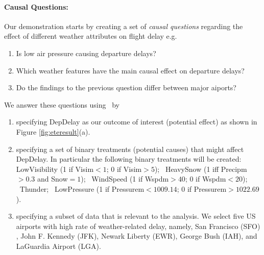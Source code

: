   \paragraph{\bf Causal Questions:}
Our demonstration starts by creating a set of {\em causal questions} regarding the effect of different weather attributes on flight delay e.g.
\begin{enumerate}
  \item Is low air pressure causing departure delays?
  \item Which weather features have the main causal effect on departure delays?
  \item Do the findings to the previous question differ between major aiports?
\end{enumerate}
We answer these questions using \GSQL\ by
    \begin{enumerate}
      \item specifying DepDelay as our outcome of interest (potential effect) as shown in Figure \ref{fig:eteresult}(a).
      \item specifying a set of binary treatments (potential causes) that might affect DepDelay. In particular the following binary treatments will be created: LowVisibility (1 if Visim$<1$; 0 if Visim$>5$); \ HeavySnow (1 iff Precipm$>0.3$ and Snow$=1$); \ WindSpeed (1 if Wspdm$>40$; 0 if Wspdm$<20$); \  Thunder; \ LowPressure (1 if Pressurem$<1009.14$; 0 if Pressurem$>1022.69$).

      \item specifying a subset of data that is relevant to the analysis.  We select five US airports  with high rate of weather-related delay, namely, San Francisco (SFO) , John F. Kennedy (JFK), Newark Liberty (EWR), George Bush (IAH), and LaGuardia Airport (LGA).
\end{enumerate}



